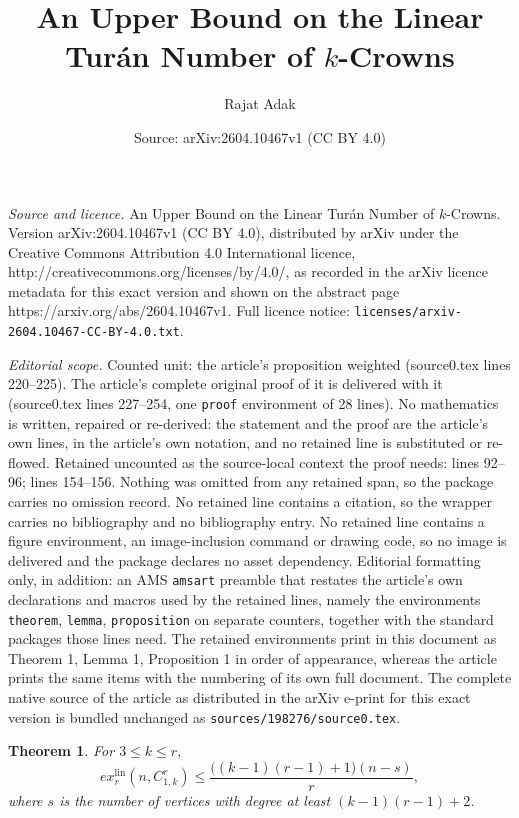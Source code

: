 \documentclass[10pt,a4paper]{amsart}
\title{An Upper Bound on the Linear Tur\'{a}n Number of $k$-Crowns}
\author{Rajat Adak}
\date{Source: arXiv:2604.10467v1 (CC BY 4.0)}
\newtheorem{theorem}{Theorem}
\begin{document}
\maketitle

\noindent\emph{Source and licence.} An Upper Bound on the Linear Tur\'{a}n Number of $k$-Crowns. Version arXiv:2604.10467v1 (CC BY 4.0), distributed by arXiv under the Creative Commons Attribution 4.0 International licence, http://creativecommons.org/licenses/by/4.0/, as recorded in the arXiv licence metadata for this exact version and shown on the abstract page https://arxiv.org/abs/2604.10467v1. Full licence notice: \texttt{licenses/arxiv-2604.10467-CC-BY-4.0.txt}.\par\smallskip

\noindent\textit{Editorial scope.} Counted unit: the article's proposition weighted (source0.tex lines 220--225). The article's complete original proof of it is delivered with it (source0.tex lines 227--254, one \texttt{proof} environment of 28 lines). No mathematics is written, repaired or re-derived: the statement and the proof are the article's own lines, in the article's own notation, and no retained line is substituted or re-flowed.  Retained uncounted as the source-local context the proof needs: lines 92--96; lines 154--156.  Nothing was omitted from any retained span, so the package carries no omission record.  No retained line contains a citation, so the wrapper carries no bibliography and no bibliography entry.  No retained line contains a figure environment, an image-inclusion command or drawing code, so no image is delivered and the package declares no asset dependency.  Editorial formatting only, in addition: an AMS \texttt{amsart} preamble that restates the article's own declarations and macros used by the retained lines, namely the environments \texttt{theorem}, \texttt{lemma}, \texttt{proposition} on separate counters, together with the standard packages those lines need.  The retained environments print in this document as Theorem 1, Lemma 1, Proposition 1 in order of appearance, whereas the article prints the same items with the numbering of its own full document.  The complete native source of the article as distributed in the arXiv e-print for this exact version is bundled unchanged as \texttt{sources/198276/source0.tex}.
\begin{theorem}\label{main}
    For $3\leq k \leq r$,
    $$ex_r^{\mathrm{lin}}(n,C^r_{1,k}) \leq \frac{\big((k-1)(r-1)+1\big)(n-s)}{r},$$
    where $s$ is the number of vertices with degree at least $(k-1)(r-1) +2$. 
\end{theorem}
\end{document}
